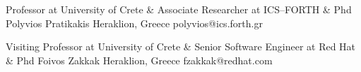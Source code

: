 


\begin{cventries}

  \cventry
    {Professor at University of Crete \& Associate Researcher at ICS--FORTH \& Phd} %
    {Polyvios Pratikakis} %
    {Heraklion, Greece} %
    {} %
    {
        polyvios@ics.forth.gr
    }

  \cventry
    {Visiting Professor at University of Crete \& Senior Software Engineer at Red Hat \& Phd} %
    {Foivos Zakkak} %
    {Heraklion, Greece} %
    {} %
    {
        fzakkak@redhat.com
    }


\end{cventries}

